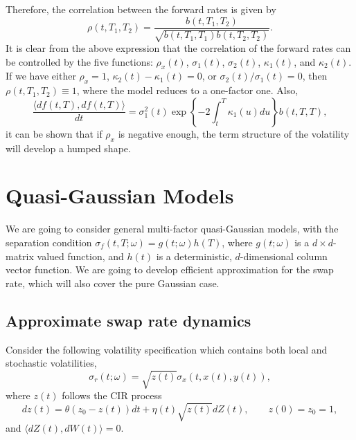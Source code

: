 \documentclass[12pt]{article}
\begin{document}
  Therefore, the correlation between the forward rates is given by
  \begin{equation}
    \rho(t,T_1,T_2)=\frac{b(t,T_1,T_2)}{\sqrt{b(t,T_1,T_1)b(t,T_2,T_2)}}.
  \end{equation}
  It is clear from the above expression that the correlation of the forward rates can be controlled by the five functions: $\rho_x(t)$,
  $\sigma_1(t)$, $\sigma_2(t)$, $\kappa_1(t)$, and $\kappa_2(t)$. If we have either $\rho_x=1$, $\kappa_2(t)-\kappa_1(t)=0$, or $\sigma_2(t)/\sigma_1(t)=0$,
  then $\rho(t,T_1,T_2)\equiv 1$, where the model reduces to a one-factor one. Also,
  \begin{equation}
    \frac{\langle df(t,T), df(t,T)\rangle}{dt}=\sigma_1^2(t)\exp\left\{-2\int_t^{T}\kappa_1(u)du\right\}b(t,T,T),
  \end{equation}
  it can be shown that if $\rho_x$ is negative enough, the term structure of the volatility will develop a humped shape.


\section{Quasi-Gaussian Models}

  We are going to consider general multi-factor quasi-Gaussian models, with the separation condition $\sigma_f(t,T;\omega)=g(t;\omega)h(T)$,
  where $g(t;\omega)$ is a $d\times d$-matrix valued function, and $h(t)$ is a deterministic, $d$-dimensional column vector function.
  We are going to develop efficient approximation for the swap rate, which will also cover the pure Gaussian case.

  \subsection{Approximate swap rate dynamics}

    Consider the following volatility specification which contains both local and stochastic volatilities,
    \begin{equation}
      \sigma_r(t;\omega) = \sqrt{z(t)}\sigma_x(t,x(t), y(t)),
    \end{equation}
    where $z(t)$ follows the CIR process
    \begin{equation}
      dz(t)=\theta(z_0-z(t))dt+\eta(t)\sqrt{z(t)}dZ(t),\quad\quad z(0)=z_0=1,
    \end{equation}
    and $\langle dZ(t),dW(t)\rangle=0$.
\end{document}
